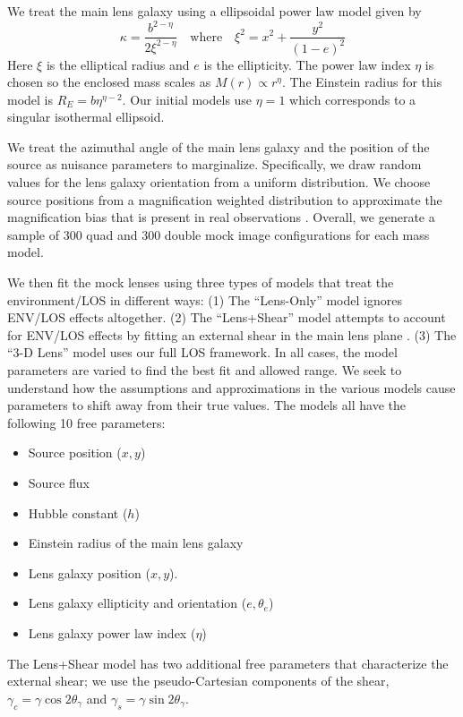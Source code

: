 \documentclass{emulateapj}
\newcommand\crk[1]{\textbf{[CRK: #1]}}
\begin{document}
We treat the main lens galaxy using a ellipsoidal power law model given by
\begin{equation}
\label{eqn:powerlaw}
\kappa = \frac{b^{2-\eta}}{2 \xi^{2-\eta}}
\quad\mbox{where}\quad
\xi^2 = x^2 + \frac{y^2}{(1-e)^2}
\end{equation}
Here $\xi$ is the elliptical radius and $e$ is the ellipticity.  The power law index $\eta$ is chosen so the enclosed mass scales as $M(r) \propto r^\eta$.
The Einstein radius for this model is $R_E = b \eta^{\eta - 2}$. Our initial models use $\eta = 1$ which corresponds to a singular isothermal ellipsoid.

We treat the azimuthal angle of the main lens galaxy and the position of the source as nuisance parameters to marginalize.  Specifically, we draw random values for the lens galaxy orientation from a uniform distribution.  We choose source positions from a magnification weighted distribution to approximate the magnification bias that is present in real observations \citep[see][]{Keeton04}.  Overall, we generate a sample of 300 quad and 300 double mock image configurations for each mass model.

We then fit the mock lenses using three types of models that treat the environment/LOS in different ways:
(1) The ``Lens-Only'' model ignores ENV/LOS effects altogether.
(2) The ``Lens+Shear'' model attempts to account for ENV/LOS effects by fitting an external shear in the main lens plane \citep[e.g.,][]{Suyu13}.
(3) The ``3-D Lens'' model uses our full LOS framework.
In all cases, the model parameters are varied to find the best fit and allowed range.  We seek to understand how the assumptions and approximations in the various models cause parameters to shift away from their true values.  The models all have the following 10 free parameters:
\begin{itemize}
\item Source position ($x,y$)
\item Source flux
\item Hubble constant ($h$)
\item Einstein radius of the main lens galaxy
\item Lens galaxy position ($x,y$).
\item Lens galaxy ellipticity and orientation ($e,\theta_e$)
\item Lens galaxy power law index ($\eta$)
\end{itemize}
The Lens+Shear model has two additional free parameters that characterize the external shear; we use the pseudo-Cartesian components of the shear, $\gamma_c = \gamma \cos 2\theta_\gamma$ and $\gamma_s = \gamma \sin 2\theta_\gamma$.
\end{document}
